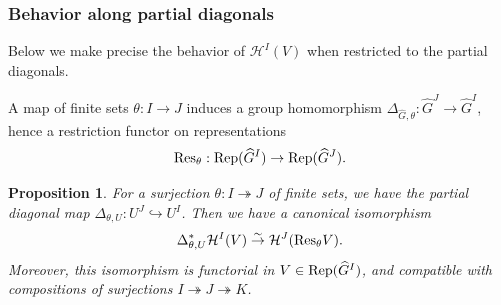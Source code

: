 \documentclass[11pt]{amsart}
\numberwithin{equation}{section}
\theoremstyle{plain}
\newtheorem{prop}[subsubsection]{Proposition}
\theoremstyle{definition}
\newcommand\cH{\mathcal{H}}
\def\dG{\widehat{G}}
\newcommand\Rep{\textup{Rep}}
\newcommand{\Res}{\textup{Res}}
\newcommand{\incl}{\hookrightarrow}
\newcommand{\isom}{\stackrel{\sim}{\to}}
\newcommand{\surj}{\twoheadrightarrow}
\newcommand\sss{\subsubsection}
\newcommand\D\Delta
\renewcommand{\th}{\theta}
\begin{document}
\sss{Behavior along partial diagonals} Below we make precise the behavior of $\cH^{I}(V)$ when restricted to the partial diagonals.

A map of finite sets $\th: I\to J$ induces a group homomorphism $\D_{\dG, \th}: \dG^{J}\to \dG^{I}$, hence a restriction functor on representations
\begin{equation*}
\Res_{\th}: \Rep(\dG^{I})\to \Rep(\dG^{J}).
\end{equation*}
 
\begin{prop} 
For a surjection $\th: I\surj J$ of finite sets, we have the partial diagonal map $\D_{\th,U}: U^{J}\incl U^{I}$.  Then we have a canonical isomorphism
\begin{equation*}
\D_{\th,U}^{*}\cH^{I}(V)\isom \cH^{J}(\Res_{\th}V).
\end{equation*}
Moreover, this isomorphism is functorial in $V\in \Rep(\dG^{I})$, and compatible with compositions of surjections $I\surj J\surj K$.
\end{prop}
\end{document}
